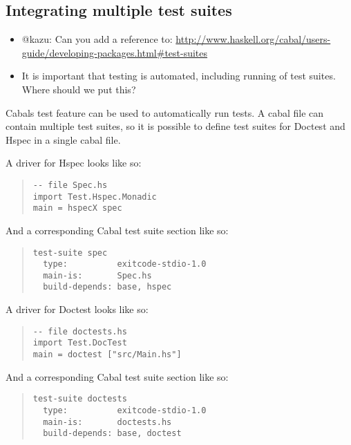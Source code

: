 \documentclass[preprint]{sigplanconf}
\newcommand{\hspec}{Hspec}
\begin{document}
\subsection{Integrating multiple test suites}

\begin{itemize}

\item @kazu: Can you add a reference to:
\url{http://www.haskell.org/cabal/users-guide/developing-packages.html#test-suites}

\item It is important that testing is automated, including running of test
    suites.  Where should we put this?
\end{itemize}

\noindent Cabals test feature can be used to automatically run tests.  A cabal
file can contain multiple test suites, so it is possible to define test suites
for Doctest and \hspec{} in a single cabal file.

A driver for \hspec{} looks like so:

\begin{quote}
\small
\begin{verbatim}
-- file Spec.hs
import Test.Hspec.Monadic
main = hspecX spec
\end{verbatim}
\end{quote}

\noindent And a corresponding Cabal test suite section like so:

\begin{quote}
\small
\begin{verbatim}
test-suite spec
  type:          exitcode-stdio-1.0
  main-is:       Spec.hs
  build-depends: base, hspec
\end{verbatim}
\end{quote}

\noindent A driver for Doctest looks like so:

\begin{quote}
\small
\begin{verbatim}
-- file doctests.hs
import Test.DocTest
main = doctest ["src/Main.hs"]
\end{verbatim}
\end{quote}

\noindent And a corresponding Cabal test suite section like so:

\begin{quote}
\small
\begin{verbatim}
test-suite doctests
  type:          exitcode-stdio-1.0
  main-is:       doctests.hs
  build-depends: base, doctest
\end{verbatim}
\end{quote}
\end{document}
